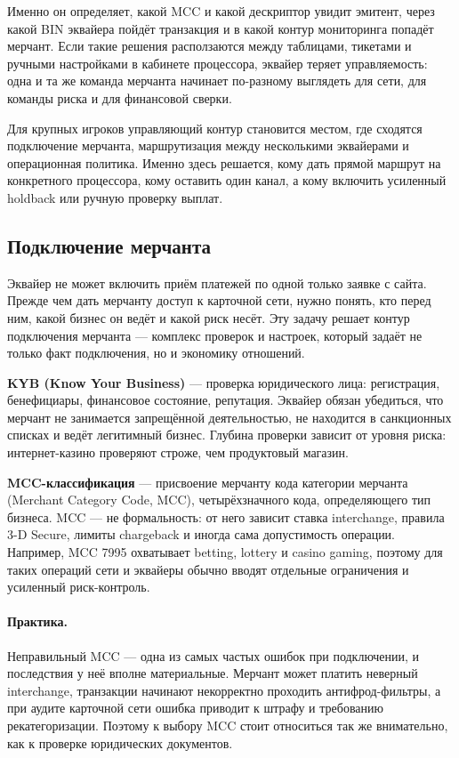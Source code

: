 Именно он определяет, какой MCC и какой дескриптор увидит
эмитент, через какой BIN эквайера пойдёт транзакция и в какой
контур мониторинга попадёт мерчант. Если такие решения
расползаются между таблицами, тикетами и ручными настройками
в кабинете процессора, эквайер теряет управляемость: одна
и та же команда мерчанта начинает по-разному выглядеть для сети,
для команды риска и для финансовой сверки.\cite{visa-merchant-data-standards-manual}

Для крупных игроков управляющий контур становится местом, где сходятся
подключение мерчанта, маршрутизация между несколькими эквайерами
и операционная политика. Именно здесь решается, кому дать прямой
маршрут на конкретного процессора, кому оставить один канал,
а кому включить усиленный holdback или ручную проверку выплат.

\subsection*{Подключение мерчанта}

Эквайер не может включить приём платежей по одной только заявке
с сайта. Прежде чем дать мерчанту доступ к карточной сети, нужно
понять, кто перед ним, какой бизнес он ведёт и какой риск несёт.
Эту задачу решает контур подключения мерчанта --- комплекс
проверок и настроек, который задаёт не только факт подключения,
но и экономику отношений.

\textbf{KYB (Know Your Business)} --- проверка юридического лица:
регистрация, бенефициары, финансовое состояние, репутация.
Эквайер обязан убедиться, что мерчант не занимается запрещённой
деятельностью, не находится в санкционных списках и ведёт
легитимный бизнес. Глубина проверки зависит от уровня риска:
интернет-казино проверяют строже, чем продуктовый магазин.

\textbf{MCC-классификация} --- присвоение мерчанту кода категории
мерчанта (Merchant Category Code, MCC), четырёхзначного кода,
определяющего тип бизнеса.
MCC --- не формальность: от него зависит ставка interchange,
правила 3-D Secure, лимиты chargeback и иногда сама допустимость
операции. Например, MCC 7995 охватывает betting, lottery
и casino gaming, поэтому для таких операций сети и эквайеры
обычно вводят отдельные ограничения и усиленный риск-контроль.\cite{visa-merchant-data-standards-manual,visa-payment-facilitator-marketplace-risk-guide}

\paragraph{Практика.}
  Неправильный MCC --- одна из самых частых ошибок при подключении,
  и последствия у неё вполне материальные. Мерчант может платить
  неверный interchange, транзакции начинают некорректно проходить
  антифрод-фильтры, а при аудите карточной сети ошибка приводит
  к штрафу и требованию рекатегоризации. Поэтому к выбору MCC
  стоит относиться так же внимательно, как к проверке юридических
  документов.


